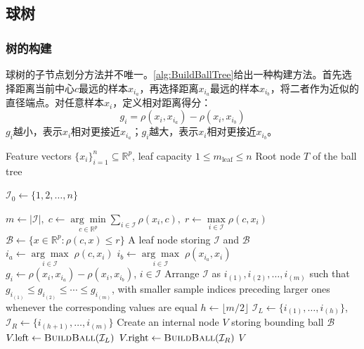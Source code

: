 \subsection{球树}
\subsubsection{树的构建}
球树的子节点划分方法并不唯一。\cref{alg:BuildBallTree}给出一种构建方法。首先选择距离当前中心$c$最远的样本$x_{i_a}$，再选择距离$x_{i_a}$最远的样本$x_{i_b}$，将二者作为近似的直径端点。对任意样本$x_i$，定义相对距离得分：
\begin{equation*}
	g_i=\rho(x_i,x_{i_a})-\rho(x_i,x_{i_b})
\end{equation*}
$g_i$越小，表示$x_i$相对更接近$x_{i_a}$；$g_i$越大，表示$x_i$相对更接近$x_{i_b}$。
\begin{algorithm}[H]
	\caption{Build a Ball Tree}
	\label{alg:BuildBallTree}
	\begin{algorithmic}[1]
		\Require Feature vectors $\{x_i\}_{i=1}^{n}\subseteq\mathbb{R}^{p}$, leaf capacity $1\leqslant m_{\mathrm{leaf}}\leqslant n$
		\Ensure Root node $T$ of the ball tree
		
		\State $\mathcal{I}_0\gets\{1,2,\dots,n\}$
		
		\State $m\gets|\mathcal{I}|,\;c\gets \underset{c\in\mathbb{R}^{p}}{\arg\min}\sum\limits_{i\in\mathcal{I}}\rho(x_i,c),\;r\gets\max\limits_{i\in\mathcal{I}}\rho(c,x_i)$
		\State $\mathcal{B}\gets\{x\in\mathbb{R}^{p}:\rho(c,x)\leqslant r\}$
		\State \Return A leaf node storing $\mathcal{I}$ and $\mathcal{B}$
		\EndIf
		\State $i_a\gets\underset{i\in\mathcal{I}}{\arg\max}\;\rho(c,x_i)$
		\State $i_b\gets\underset{i\in\mathcal{I}}{\arg\max}\;\rho(x_{i_a},x_i)$
		\State $g_i\gets\rho(x_i,x_{i_a})-\rho(x_i,x_{i_b})$, $i\in\mathcal{I}$
		\State Arrange $\mathcal{I}$ as $i_{(1)},i_{(2)},\dots,i_{(m)}$ such that $g_{i_{(1)}}\leqslant g_{i_{(2)}}\leqslant\cdots\leqslant g_{i_{(m)}}$, with smaller sample indices preceding larger ones whenever the corresponding values are equal
		\State $h\gets\lfloor m/2\rfloor$
		\State $\mathcal{I}_L\gets\{i_{(1)},\dots,i_{(h)}\}$, $\mathcal{I}_R\gets\{i_{(h+1)},\dots,i_{(m)}\}$
		\State Create an internal node $V$ storing bounding ball $\mathcal{B}$
		\State $V.\text{left}\gets\Call{BuildBall}{\mathcal{I}_L}$
		\State $V.\text{right}\gets\Call{BuildBall}{\mathcal{I}_R}$
		\State \Return $V$
		\EndFunction
		
		\State \Return {}
	\end{algorithmic}
\end{algorithm}
